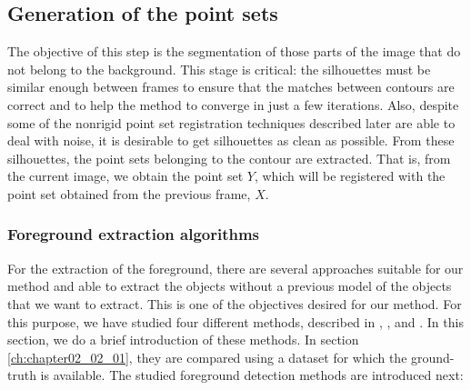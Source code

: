 \subsection{Generation of the point sets}\label{ch:chapter02_01_01}

The objective of this step is the segmentation of those parts of the image that do not belong to the background. This stage is critical: the silhouettes must be similar enough between frames to ensure that the matches between contours are correct and to help the method to converge in just a few iterations. Also, despite some of the nonrigid point set registration techniques described later are able to deal with noise, it is desirable to get silhouettes as clean as possible. From these silhouettes, the point sets belonging to the contour are extracted. That is, from the current image, we obtain the point set $Y$, which will be registered with the point set obtained from the previous frame, $X$.

\subsubsection{Foreground extraction algorithms}\label{ch:chapter02_01_01_01}

For the extraction of the foreground, there are several approaches suitable for our method and able to extract the objects without a previous model of the objects that we want to extract. This is one of the objectives desired for our method. For this purpose, we have studied four different methods, described in \cite{lopez2011stochastic}, \cite{lopez2011foreground}, \cite{guo2011hierarchical} and \cite{reddy2012improved}. In this section, we do a brief introduction of these methods. In section \ref{ch:chapter02_02_01}, they are compared using a dataset for which the ground-truth is available.
The studied foreground detection methods are introduced next:

